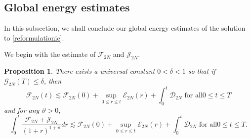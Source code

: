 \documentclass[a4paper,reqno,11pt]{amsart}
\numberwithin{equation}{section}
\newtheorem{prop}[lem]{Proposition}
\begin{document}
\subsection{Global energy estimates}

In this subsection, we shall conclude our global energy estimates of the solution to \eqref{reformulationic}.

We begin with the estimate of ${\mathcal{F}_{2N}} $ and $\mathcal{J}_{2N}$.

\begin{prop}\label{p_f_bound}
There exists a universal constant $0<\delta<1$ so that if $\mathcal{G}_{2N}(T)\le\delta$, then
\begin{equation}\label{grow1}
{\mathcal{F}_{2N}}(t)
  {\lesssim}  {\mathcal{F}_{2N}}(0)+  \sup_{0\le r\le t}\mathcal{E}_{2N}(r)+ \int_0^t \mathcal{D}_{2N} \text{ for all
}0\le t\le T
\end{equation}
and for any $\vartheta>0$,
\begin{equation}\label{grow2}
  \int_0^t \frac{{\mathcal{F}_{2N}}+\mathcal{J}_{2N}}{(1+r)^{1+\vartheta}}dr
  {\lesssim}  {\mathcal{F}_{2N}}(0)+  \sup_{0\le r\le t}\mathcal{E}_{2N}(r)+ \int_0^t \mathcal{D}_{2N} \text{ for all
}0\le t\le T.
\end{equation}
\end{prop}
\end{document}
